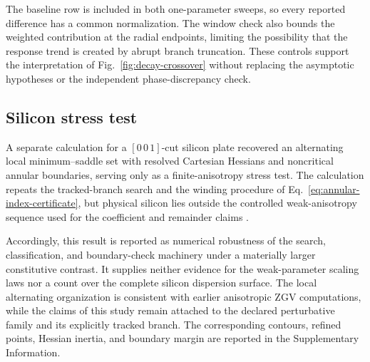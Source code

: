 The baseline row is included in both one-parameter sweeps, so every reported
difference has a common normalization.  The window check also bounds the
weighted contribution at the radial endpoints, limiting the possibility that
the response trend is created by abrupt branch truncation.  These controls
support the interpretation of Fig.~\ref{fig:decay-crossover} without replacing
the asymptotic hypotheses or the independent phase-discrepancy check.

\subsection{Silicon stress test}

A separate calculation for a \([0\,0\,1]\)-cut silicon plate recovered an
alternating local minimum--saddle set with resolved Cartesian Hessians and noncritical
annular boundaries, serving only as a finite-anisotropy stress test.  The
calculation repeats the tracked-branch search and the winding procedure of
Eq.~\eqref{eq:annular-index-certificate}, but physical silicon lies outside the
controlled weak-anisotropy sequence used for the coefficient and remainder
claims \citep{prada2009anisotropy,kiefer2023beating}.

Accordingly, this result is reported as numerical robustness of the search,
classification, and boundary-check machinery under a materially larger
constitutive contrast.  It supplies neither evidence for the weak-parameter
scaling laws nor a count over the complete silicon dispersion surface.  The
local alternating organization is consistent with earlier anisotropic ZGV
computations, while the claims of this study remain attached to the declared
perturbative family and its explicitly tracked branch.
The corresponding contours, refined points, Hessian inertia, and boundary
margin are reported in the Supplementary Information.

